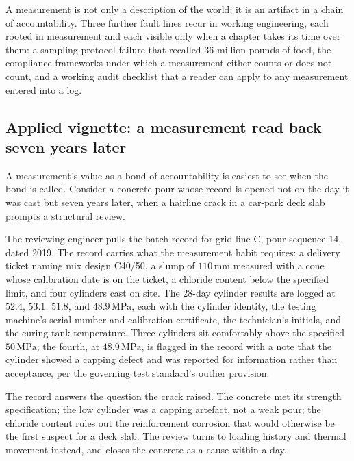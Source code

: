 A measurement is not only a description of the world; it is an
artifact in a chain of accountability. Three further fault lines
recur in working engineering, each rooted in measurement and each
visible only when a chapter takes its time over them: a
sampling-protocol failure that recalled 36 million pounds of food,
the compliance frameworks under which a measurement either counts
or does not count, and a working audit checklist that a reader can
apply to any measurement entered into a log.

\subsection{Applied vignette: a measurement read back seven years later}

A measurement's value as a bond of accountability is easiest to see
when the bond is called. Consider a concrete pour whose record is
opened not on the day it was cast but seven years later, when a hairline
crack in a car-park deck slab prompts a structural review.

The reviewing engineer pulls the batch record for grid line C, pour
sequence 14, dated 2019. The record carries what the measurement habit
requires: a delivery ticket naming mix design C40/50, a slump of
$110 \,\si{\milli\meter}$ measured with a cone whose calibration date
is on the ticket, a chloride content below the specified limit, and
four cylinders cast on site. The 28-day cylinder results are logged at
$52.4$, $53.1$, $51.8$, and $48.9 \,\si{\mega\pascal}$, each with the
cylinder identity, the testing machine's serial number and calibration
certificate, the technician's initials, and the curing-tank
temperature. Three cylinders sit comfortably above the specified
$50 \,\si{\mega\pascal}$; the fourth, at $48.9 \,\si{\mega\pascal}$, is
flagged in the record with a note that the cylinder showed a capping
defect and was reported for information rather than acceptance, per the
governing test standard's outlier provision.

The record answers the question the crack raised. The concrete met its
strength specification; the low cylinder was a capping artefact, not a
weak pour; the chloride content rules out the reinforcement corrosion
that would otherwise be the first suspect for a deck slab. The review
turns to loading history and thermal movement instead, and closes the
concrete as a cause within a day.

